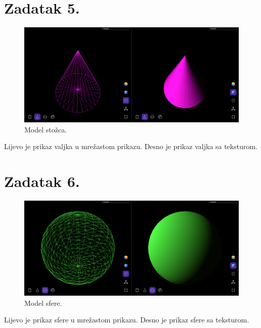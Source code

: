 \documentclass[a4paper,12pt]{article}
\begin{document}
\pagebreak

\section*{Zadatak 5.}


\begin{figure}[ht]
    \centering
    \includegraphics[scale=0.5]{image/zadatak5.png}
    \caption{Model stožca.}
\end{figure}
Lijevo je prikaz valjka u mrežastom prikazu. Desno je prikaz valjka sa teksturom.

\pagebreak

\section*{Zadatak 6.}


\begin{figure}[ht]
    \centering
    \includegraphics[scale=0.5]{image/zadatak6.png}
    \caption{Model sfere.}
\end{figure}

Lijevo je prikaz sfere u mrežastom prikazu. Desno je prikaz sfere sa teksturom.

\pagebreak
\end{document}
